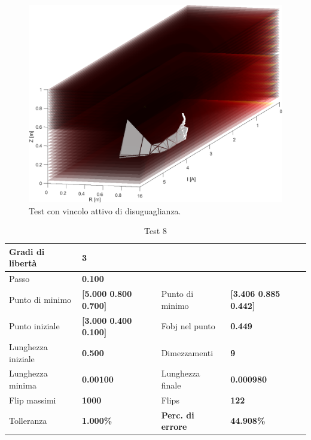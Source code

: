 \documentclass[a4paper, 11pt]{article}
\begin{document}
\begin{figure}[H]
    \centering
        \includegraphics[width=14cm]{assets/figure7}
        \caption{Test con vincolo attivo di disuguaglianza.}
\end{figure}
\noindent

\begin{table}[h]
    \caption{Test 8}
    \begin{center}
    \begin{tabular}{|l|l|l|l|} 
    \hline 
Gradi di libertà & \textbf{3} &  &  \\ \hline 
Passo & \textbf{0.100} &  &  \\ \hline 
Punto di minimo & \textbf{{[}5.000 0.800 0.700{]}} & Punto di minimo &
\textbf{{[}3.406 0.885 0.442{]}} \\ \hline 
Punto iniziale & \textbf{{[}3.000 0.400 0.100{]}} & Fobj nel punto &
\textbf{0.449} \\ \hline 
Lunghezza iniziale & \textbf{0.500} & Dimezzamenti & \textbf{9} \\ \hline 
Lunghezza minima & \textbf{0.00100} & Lunghezza finale & \textbf{0.000980} \\
\hline
Flip massimi & \textbf{1000} & Flips & \textbf{122} \\ \hline 
Tolleranza & \textbf{1.000\%} & \textbf{Perc. di errore} & \textbf{44.908\%} \\
\hline 
    \end{tabular}
    \end{center}
    \end{table}
\end{document}
